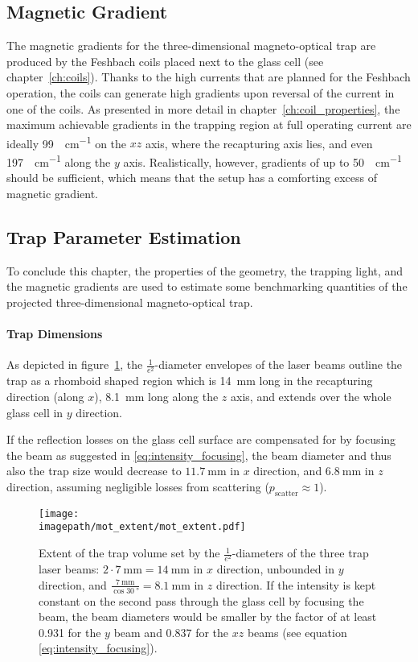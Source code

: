 \subsection*{Magnetic Gradient}
The magnetic gradients for the three-dimensional magneto-optical trap are produced by the Feshbach coils placed next to the glass cell (see chapter~\ref{ch:coils}). Thanks to the high currents that are planned for the Fesh\-bach operation, the coils can generate high gradients upon reversal of the current in one of the coils. As presented in more detail in chapter~\ref{ch:coil_properties}, the maximum achievable gradients in the trapping region at full operating current are ideally \SI{99}{\gauss\per\centi\meter} on the $xz$ axis, where the recapturing axis lies, and even \SI{197}{\gauss\per\centi\meter} along the $y$ axis. Realistically, however, gradients of up to \SI{50}{\gauss\per\centi\meter} should be sufficient, which means that the setup has a comforting excess of magnetic gradient.

\subsection*{Trap Parameter Estimation}
To conclude this chapter, the properties of the geometry, the trapping light, and the magnetic gradients are used to estimate some benchmarking quantities of the projected three-dimensional magneto-optical trap.

\paragraph{Trap Dimensions}
As depicted in figure~\ref{fig:mot_extent}, the  $\frac{1}{e^2}$-diameter envelopes of the laser beams outline the trap as a rhomboid shaped region which is \SI[]{14}{\milli\meter} long in the recapturing direction (along $x$), \SI[]{8.1}{\milli\meter} long along the $z$ axis, and extends over the whole glass cell in $y$ direction.

If the reflection losses on the glass cell surface are compensated for by focusing the beam as suggested in \eqref{eq:intensity_focusing}, the beam diameter and thus also the trap size would decrease to $\SI[]{11.7}{\milli\meter}$ in $x$ direction, and $\SI[]{6.8}{\milli\meter}$ in $z$ direction, assuming negligible losses from scattering ($p_\text{scatter} \approx 1$).

\begin{figure}
    \centering
    \texttt{[image: \\imagepath/mot\_extent/mot\_extent.pdf]}
    \caption{Extent of the trap volume set by the $\frac{1}{e^2}$-diameters of the three trap laser beams: $2\cdot \SI[]{7}{\milli\meter} = \SI[]{14}{\milli\meter}$ in $x$ direction, unbounded in $y$ direction, and $\frac{\SI[]{7}{\milli\meter}}{\cos \SI[]{30}{\degree}} = \SI[]{8.1}{\milli\meter}$ in $z$ direction. If the intensity is kept constant on the second pass through the glass cell by focusing the beam, the beam diameters would be smaller by the factor of at least \SI{0.931}{} for the $y$ beam and \SI{0.837}{} for the $xz$ beams (see equation \ref{eq:intensity_focusing}).}
    \label{fig:mot_extent}
\end{figure}

